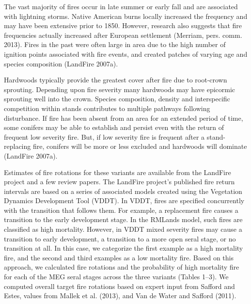 The vast majority of fires occur in late summer or early fall and are associated with lightning storms. Native American burns locally increased the frequency and may have been extensive prior to 1850. However, research also suggests that fire frequencies actually increased after European settlement (Merriam, pers. comm. 2013). Fires in the past were often large in area due to the high number of ignition points associated with fire events, and created patches of varying age and species composition (LandFire 2007a). 

Hardwoods typically provide the greatest cover after fire due to root-crown sprouting. Depending upon fire severity many hardwoods may have epicormic sprouting well into the crown. Species composition, density and interspecific competition within stands contributes to multiple pathways following disturbance. If fire has been absent from an area for an extended period of time, some conifers may be able to establish and persist even with the return of frequent low severity fire. But, if low severity fire is frequent after a stand-replacing fire, conifers will be more or less excluded and hardwoods will dominate (LandFire 2007a).

Estimates of fire rotations for these variants are available from the LandFire project and a few review papers. The LandFire project’s published fire return intervals are based on a series of associated models created using the Vegetation Dynamics Development Tool (VDDT). In VDDT, fires are specified concurrently with the transition that follows them. For example, a replacement fire causes a transition to the early development stage. In the RMLands model, such fires are classified as high mortality. However, in VDDT mixed severity fires may cause a transition to early development, a transition to a more open seral stage, or no transition at all. In this case, we categorize the first example as a high mortality fire, and the second and third examples as a low mortality fire. Based on this approach, we calculated fire rotations and the probability of high mortality fire for each of the MEG seral stages across the three variants (Tables 1–3). We computed overall target fire rotations based on expert input from Safford and Estes, values from Mallek et al. (2013), and Van de Water and Safford (2011). 

